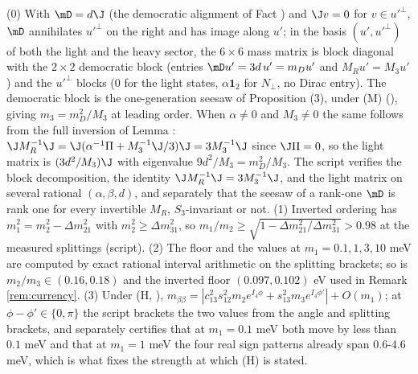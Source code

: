 (0) With $\mD = d\J$ (the democratic alignment of Fact ) and $\J v = 0$ for $v \in u'^{\perp}$, $\mD$ annihilates $u'^{\perp}$ on the right and has image along $u'$; in the basis $(u', u'^{\perp})$ of both the light and the heavy sector, the $6 \times 6$ mass matrix is block diagonal with the $2 \times 2$ democratic block (entries $\mD u' = 3d\,u' = m_{D}u'$ and $M_{R}u' = M_{3}u'$) and the $u'^{\perp}$ blocks ($0$ for the light states, $\alpha\mathbf{1}_{2}$ for $N_{\perp}$, no Dirac entry). The democratic block is the one-generation seesaw of Proposition (3), under (M) (), giving $m_{3} = m_{D}^{2}/M_{3}$ at leading order. When $\alpha \neq 0$ and $M_{3} \neq 0$ the same follows from the full inversion of Lemma : $\J M_{R}^{-1}\J = \J(\alpha^{-1}\Pi + M_{3}^{-1}\J/3)\J = 3M_{3}^{-1}\J$ since $\J\Pi = 0$, so the light matrix is $(3d^{2}/M_{3})\J$ with eigenvalue $9d^{2}/M_{3} = m_{D}^{2}/M_{3}$. The script verifies the block decomposition, the identity $\J M_{R}^{-1}\J = 3M_{3}^{-1}\J$, and the light matrix on several rational $(\alpha, \beta, d)$, and separately that the seesaw of a rank-one $\mD$ is rank one for every invertible $M_{R}$, $S_{3}$-invariant or not. (1) Inverted ordering has $m_{1}^{2} = m_{2}^{2} - \Delta m^{2}_{21}$ with $m_{2}^{2} \ge \Delta m^{2}_{31}$, so $m_{1}/m_{2} \ge \sqrt{1 - \Delta m^{2}_{21}/\Delta m^{2}_{31}} > 0.98$ at the measured splittings (script). (2) The floor and the values at $m_{1} = 0.1, 1, 3, 10$ meV are computed by exact rational interval arithmetic on the splitting brackets; so is $m_{2}/m_{3} \in (0.16, 0.18)$ and the inverted floor $(0.097, 0.102)$ eV used in Remark \ref{rem:currency}. (3) Under (H, ), $m_{\beta\beta} = |c_{13}^{2}s_{12}^{2}m_{2}e^{I_4\phi} + s_{13}^{2}m_{3}e^{I_4\phi'}| + O(m_{1})$; at $\phi - \phi' \in \{0, \pi\}$ the script brackets the two values from the angle and splitting brackets, and separately certifies that at $m_{1} = 0.1$ meV both move by less than $0.1$ meV and that at $m_{1} = 1$ meV the four real sign patterns already span $0.6$-$4.6$ meV, which is what fixes the strength at which (H) is stated.
